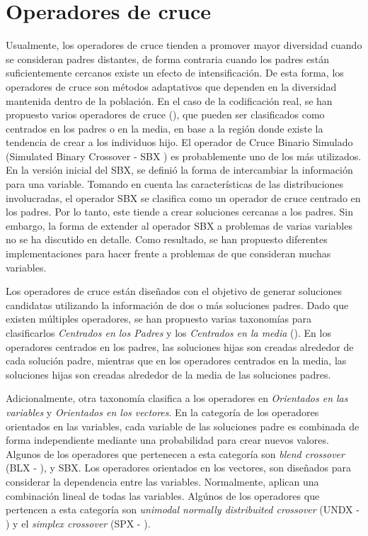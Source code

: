 \section{Operadores de cruce}

Usualmente, los operadores de cruce tienden a promover mayor diversidad cuando se consideran padres distantes, de forma contraria cuando los padres están suficientemente cercanos existe un efecto de intensificación.
%
De esta forma, los operadores de cruce son métodos adaptativos que dependen en la diversidad mantenida dentro de la población.
%
En el caso de la codificación real, se han propuesto varios operadores de cruce (\cite{herrera2003taxonomy}), que pueden ser clasificados como centrados en los padres o en la media, en base a la región donde existe la tendencia de crear a los individuos hijo.
%
El operador de Cruce Binario Simulado (Simulated Binary Crossover - SBX  \cite{deb1999self}) es probablemente uno de los más utilizados.
%
En la versión inicial del SBX, se definió la forma de intercambiar la información para una variable.
%
Tomando en cuenta las características de las distribuciones involucradas, el operador SBX se clasifica como un operador de cruce centrado en los padres.
%
Por lo tanto, este tiende a crear soluciones cercanas a los padres.
%
Sin embargo, la forma de extender al operador SBX a problemas de varias variables no se ha discutido en detalle.
%
Como resultado, se han propuesto diferentes implementaciones para hacer frente a problemas de que consideran muchas variables.
%


Los operadores de cruce están diseñados con el objetivo de generar soluciones candidatas utilizando la información de dos o más soluciones padres.
%
Dado que existen múltiples operadores, se han propuesto varias taxonomías para clasificarlos \textit{Centrados en los Padres} y los \textit{Centrados en la media} (\cite{jain2011parent}).
%
En los operadores centrados en los padres, las soluciones hijas son creadas alrededor de cada solución padre, mientras que en los operadores centrados en la media, las soluciones hijas son creadas alrededor de la media de las soluciones padres.
%

Adicionalmente, otra taxonomía clasifica a los operadores en \textit{Orientados en las variables} y \textit{Orientados en los vectores}.
%
En la categoría de los operadores orientados en las variables, cada variable de las soluciones padre es combinada de forma independiente mediante una probabilidad para crear nuevos valores.
%
Algunos de los operadores que pertenecen a esta categoría son \textit{blend crossover} (BLX - \cite{eshelman1993real} ), y SBX.
%
Los operadores orientados en los vectores, son diseñados para considerar la dependencia entre las variables.
%
Normalmente, aplican una combinación lineal de todas las variables.
%
Algúnos de los operadores que pertencen a esta categoría son \textit{unimodal normally distribuited crossover} (UNDX - \cite{Joel:UNDX}) y el \textit{simplex crossover} (SPX - \cite{Joel:DE_Storn_SPX} ).
%



